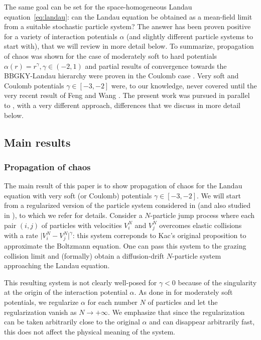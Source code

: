 \documentclass[11pt,a4paper]{article}
\theoremstyle{definition}
\theoremstyle{plain}
\begin{document}
The same goal can be set for the space-homogeneous Landau equation~\eqref{eq:landau}: can the Landau equation be obtained as a mean-field limit from a suitable stochastic particle system? 
The answer has been proven positive for a variety of interaction potentials $\alpha$ (and slightly different particle systems to start with), that we will review in more detail below. To summarize, propagation of chaos was shown for the case of moderately soft to hard potentials $\alpha(r)=r^\gamma, \gamma\in(-2,1)$ \cite{FontbonaGuerinMeleard2007, Carrapatoso2015, FournierHauray2015, NicolasFournierArnaudGuillin2017, CarrilloFengGuo2024} and partial results of convergence towards the BBGKY-Landau hierarchy were proven in the Coulomb case \cite{MiotPulvirentiSaffirio2011, CarrilloGuo2025}. Very soft and Coulomb potentials $\gamma\in[-3,-2]$ were, to our knowledge, never covered until the very recent result of Feng and Wang \cite{FengWang2025}. The present work was pursued in parallel to \cite{FengWang2025}, with a very different approach, differences that we discuss in more detail below.

\subsection{Main results}
\label{ssec:mainresult}

\subsubsection{Propagation of chaos}

The main result of this paper is to show propagation of chaos for the Landau equation with very soft (or Coulomb) potentials $\gamma\in[-3,-2]$. We will start from a regularized version of the particle system considered in \cite{MiotPulvirentiSaffirio2011, Carrapatoso2015} (and also studied in \cite{NicolasFournierArnaudGuillin2017}), to which we refer for details. Consider a $N$-particle jump process where each pair $(i,j)$ of particles with velocities $V^N_i$ and $V^N_j$ overcomes elastic collisions with a rate $\vert V^N_i - V^N_j\vert^\gamma$: this system correponds to Kac's original proposition to approximate the Boltzmann equation. One can pass this system to the grazing collision limit and (formally) obtain a diffusion-drift $N$-particle system approaching the Landau equation.

This resulting system is not clearly well-posed for $\gamma<0$ because of the singularity at the origin of the interaction potential $\alpha$. As done in \cite{FournierHauray2015} for moderately soft potentials, we regularize $\alpha$ for each number $N$ of particles and let the regularization vanish as $N\rightarrow+\infty$. We emphasize that since the regularization can be taken arbitrarily close to the original $\alpha$ and can disappear arbitrarily fast, this does not affect the physical meaning of the system.
\end{document}
